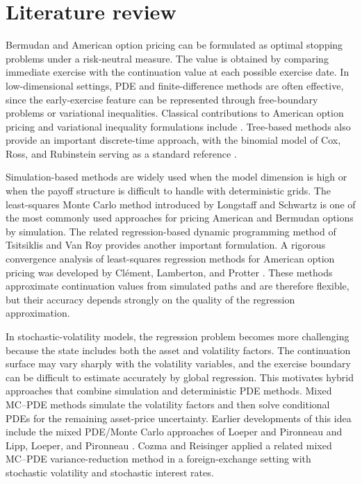 \documentclass[10pt]{article}
\theoremstyle{plain}
\theoremstyle{definition}
\theoremstyle{remark}
\begin{document}
\section{Literature review}

Bermudan and American option pricing can be formulated as optimal stopping problems under a risk-neutral measure. The value is obtained by comparing immediate exercise with the continuation value at each possible exercise date. In low-dimensional settings, PDE and finite-difference methods are often effective, since the early-exercise feature can be represented through free-boundary problems or variational inequalities. Classical contributions to American option pricing and variational inequality formulations include \citep{merton1977americanput,jaillet1990variational}. Tree-based methods also provide an important discrete-time approach, with the binomial model of Cox, Ross, and Rubinstein serving as a standard reference \citep{cox1979option}.

Simulation-based methods are widely used when the model dimension is high or when the payoff structure is difficult to handle with deterministic grids. The least-squares Monte Carlo method introduced by Longstaff and Schwartz \citep{longstaff2001valuing} is one of the most commonly used approaches for pricing American and Bermudan options by simulation. The related regression-based dynamic programming method of Tsitsiklis and Van Roy \citep{tsitsiklis2001regression} provides another important formulation. A rigorous convergence analysis of least-squares regression methods for American option pricing was developed by Cl\'ement, Lamberton, and Protter \citep{clement2002analysis}. These methods approximate continuation values from simulated paths and are therefore flexible, but their accuracy depends strongly on the quality of the regression approximation.

In stochastic-volatility models, the regression problem becomes more challenging because the state includes both the asset and volatility factors. The continuation surface may vary sharply with the volatility variables, and the exercise boundary can be difficult to estimate accurately by global regression. This motivates hybrid approaches that combine simulation and deterministic PDE methods. Mixed MC--PDE methods simulate the volatility factors and then solve conditional PDEs for the remaining asset-price uncertainty. Earlier developments of this idea include the mixed PDE/Monte Carlo approaches of Loeper and Pironneau \citep{loeper2009mixed} and Lipp, Loeper, and Pironneau \citep{lipp2013mixing}. Cozma and Reisinger \citep{cozma2017mixed} applied a related mixed MC--PDE variance-reduction method in a foreign-exchange setting with stochastic volatility and stochastic interest rates.
\end{document}
